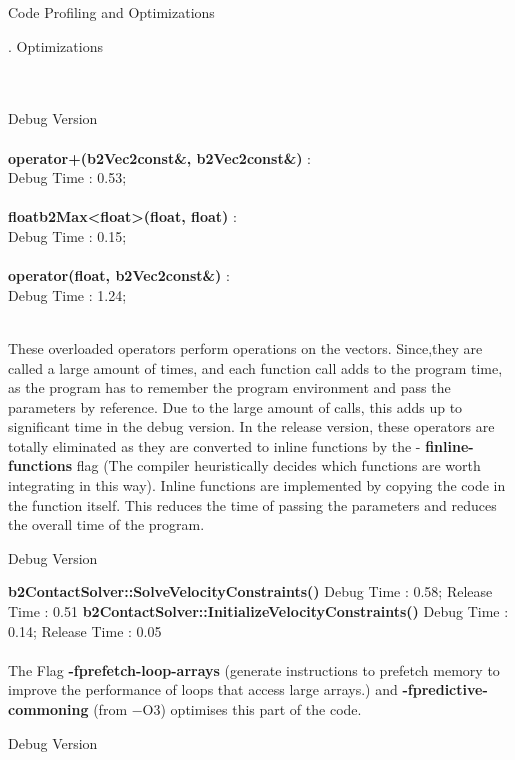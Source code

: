 \documentclass[a4paper,11pt]{resume}
\begin{document}
\begin{rSection}{{\heading Code Profiling and Optimizations}}
\begin{rSubsection}{{. Optimizations}}{}{}{}
\\ \\ \\
\begin{rSubsection}{{ Debug Version}}{}{}{}
\\ \\
\textbf{operator+(b2Vec2const\&, b2Vec2const\&)} : \\
Debug Time : 0.53;  \\ \\
\textbf{floatb2Max\textless  float\textgreater (float, float)} : \\ 
Debug Time : 0.15; \\ \\
\textbf{operator\text{*}(float, b2Vec2const\&) } : \\
Debug Time : 1.24; 
\\ \\
\begin{rSubsection}{}{}{}{}
These overloaded operators perform operations on the vectors. Since,they are called a large amount of times, and each function call adds to the program time, as the program has to remember the program environment and pass the parameters by reference. Due to the large amount of calls, this adds up to significant time in the debug version. In the release version, these operators are totally eliminated as they are converted to inline functions by the - \textbf{finline-functions} flag (The compiler heuristically decides which functions are worth integrating in this way). Inline functions are implemented by copying the code in the function itself. This reduces the time of passing the parameters and reduces the overall time of the program.
\\
\end{rSubsection}
\end{rSubsection}
\begin{rSubsection}{{ Debug Version}}{}{}{}

\textbf{b2ContactSolver::SolveVelocityConstraints() }\newline
Debug Time : 0.58; Release Time : 0.51 \newline \newline
\textbf{b2ContactSolver::InitializeVelocityConstraints() } \newline
Debug Time : 0.14; Release Time : 0.05 \\ \\
The Flag \textbf{-fprefetch-loop-arrays} (generate instructions to prefetch memory to improve the performance of loops that access large arrays.) and \textbf{-fpredictive-commoning} (from −O3) optimises this part of the code. \newline \newline
\end{rSubsection}
\begin{rSubsection}{{ Debug Version}}{}{}{}


\end{rSubsection}
\end{rSubsection}
\end{rSection}
\end{document}
